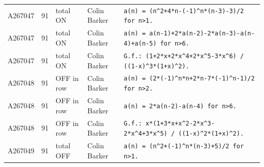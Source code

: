 \documentclass[11pt]{article}
\theoremstyle{definition}
\theoremstyle{remark}
\begin{document}
{\begin{longtable}{p{1.3cm}p{0.7cm}p{2.4cm}p{2.3cm}p{7.3cm}}
A267047 & 91 & total ON & Colin Barker & \texttt{a(n)\allowbreak{} \allowbreak{}=\allowbreak{} \allowbreak{}(n\^{}2+\allowbreak{}4*\allowbreak{}n-\allowbreak{}(-\allowbreak{}1)\allowbreak{}\^{}n*\allowbreak{}(n-\allowbreak{}3)\allowbreak{}-\allowbreak{}3)\allowbreak{}/\allowbreak{}2 \allowbreak{}for \allowbreak{}n>1.} \\
A267047 & 91 & total ON & Colin Barker & \texttt{a(n)\allowbreak{} \allowbreak{}=\allowbreak{} \allowbreak{}a(n-\allowbreak{}1)\allowbreak{}+\allowbreak{}2*\allowbreak{}a(n-\allowbreak{}2)\allowbreak{}-\allowbreak{}2*\allowbreak{}a(n-\allowbreak{}3)\allowbreak{}-\allowbreak{}a(n-\allowbreak{}4)\allowbreak{}+\allowbreak{}a(n-\allowbreak{}5)\allowbreak{} \allowbreak{}for \allowbreak{}n>6.} \\
A267047 & 91 & total ON & Colin Barker & \texttt{G.f.: \allowbreak{}(1+\allowbreak{}2*\allowbreak{}x+\allowbreak{}2*\allowbreak{}x\^{}4+\allowbreak{}2*\allowbreak{}x\^{}5-\allowbreak{}3*\allowbreak{}x\^{}6)\allowbreak{} \allowbreak{}/\allowbreak{} \allowbreak{}((1-\allowbreak{}x)\allowbreak{}\^{}3*\allowbreak{}(1+\allowbreak{}x)\allowbreak{}\^{}2)\allowbreak{}.} \\
A267048 & 91 & OFF in row & Colin Barker & \texttt{a(n)\allowbreak{} \allowbreak{}=\allowbreak{} \allowbreak{}(2*\allowbreak{}(-\allowbreak{}1)\allowbreak{}\^{}n*\allowbreak{}n+\allowbreak{}2*\allowbreak{}n-\allowbreak{}7*\allowbreak{}(-\allowbreak{}1)\allowbreak{}\^{}n-\allowbreak{}1)\allowbreak{}/\allowbreak{}2 \allowbreak{}for \allowbreak{}n>2.} \\
A267048 & 91 & OFF in row & Colin Barker & \texttt{a(n)\allowbreak{} \allowbreak{}=\allowbreak{} \allowbreak{}2*\allowbreak{}a(n-\allowbreak{}2)\allowbreak{}-\allowbreak{}a(n-\allowbreak{}4)\allowbreak{} \allowbreak{}for \allowbreak{}n>6.} \\
A267048 & 91 & OFF in row & Colin Barker & \texttt{G.f.: \allowbreak{}x*\allowbreak{}(1+\allowbreak{}3*\allowbreak{}x+\allowbreak{}x\^{}2-\allowbreak{}2*\allowbreak{}x\^{}3-\allowbreak{}2*\allowbreak{}x\^{}4+\allowbreak{}3*\allowbreak{}x\^{}5)\allowbreak{} \allowbreak{}/\allowbreak{} \allowbreak{}((1-\allowbreak{}x)\allowbreak{}\^{}2*\allowbreak{}(1+\allowbreak{}x)\allowbreak{}\^{}2)\allowbreak{}.} \\
A267049 & 91 & total OFF & Colin Barker & \texttt{a(n)\allowbreak{} \allowbreak{}=\allowbreak{} \allowbreak{}(n\^{}2+\allowbreak{}(-\allowbreak{}1)\allowbreak{}\^{}n*\allowbreak{}(n-\allowbreak{}3)\allowbreak{}+\allowbreak{}5)\allowbreak{}/\allowbreak{}2 \allowbreak{}for \allowbreak{}n>1.} \\

\end{longtable}}
\end{document}
